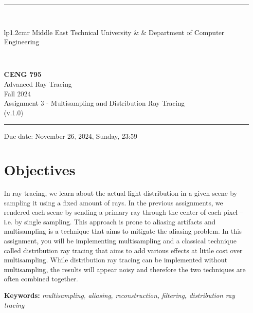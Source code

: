 \documentclass[12pt]{article}
\newcommand{\HRule}{\rule{\linewidth}{1mm}}
\begin{document}
\noindent \HRule \\[3mm]
\small
\begin{tabular}[b]{lp{1.2cm}r}
\href{https://www.metu.edu.tr/}{} Middle East Technical
University &  &
\href{https://ceng.metu.edu.tr/information}{} Department of Computer Engineering \\
\end{tabular} \\
\begin{center}

                 \LARGE \textbf{CENG 795} \\[4mm]
                 \Large Advanced Ray Tracing \\[4mm]
                \normalsize Fall 2024 \\
                    \normalsize Assignment 3 - Multisampling and Distribution Ray Tracing \\
                    \normalsize (v.1.0)
\end{center}
\HRule

\begin{center}
Due date: November 26, 2024, Sunday, 23:59
\end{center}


\section{Objectives}

In ray tracing, we learn about the actual light distribution in a given
scene by sampling it using a fixed amount of rays. In the previous
assignments, we rendered each scene by sending a primary ray through the
center of each pixel -- i.e. by single sampling. This approach is prone
to aliasing artifacts and multisampling is a technique that aims to
mitigate the aliasing problem. In this assignment, you will be
implementing multisampling and a classical technique called distribution
ray tracing that aims to add various effects at little cost over
multisampling. While distribution ray tracing can be implemented
without multisampling, the results will appear noisy and therefore the
two techniques are often combined together.

\vspace{0.5cm} \noindent \textbf{Keywords:} \emph{multisampling,
    aliasing, reconstruction, filtering, distribution ray tracing}
\end{document}
